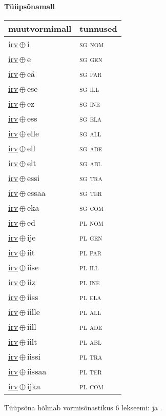 

\vspace{3.5em}
\noindent \begin{minipage}{\textwidth}
\noindent \textbf{Tüüpsõnamall \,}\\

\begin{sideways}
\begin{tabular}{l l}
muutvormimall & tunnused \\
\hline
\underline{irv}\,$\oplus$\,i & \textsc{ sg nom } \\
\underline{irv}\,$\oplus$\,e & \textsc{ sg gen } \\
\underline{irv}\,$\oplus$\,eä & \textsc{ sg par } \\
\underline{irv}\,$\oplus$\,ese & \textsc{ sg ill } \\
\underline{irv}\,$\oplus$\,ez & \textsc{ sg ine } \\
\underline{irv}\,$\oplus$\,ess & \textsc{ sg ela } \\
\underline{irv}\,$\oplus$\,elle & \textsc{ sg all } \\
\underline{irv}\,$\oplus$\,ell & \textsc{ sg ade } \\
\underline{irv}\,$\oplus$\,elt & \textsc{ sg abl } \\
\underline{irv}\,$\oplus$\,essi & \textsc{ sg tra } \\
\underline{irv}\,$\oplus$\,essaa & \textsc{ sg ter } \\
\underline{irv}\,$\oplus$\,eka & \textsc{ sg com } \\
\underline{irv}\,$\oplus$\,ed & \textsc{ pl nom } \\
\underline{irv}\,$\oplus$\,ije & \textsc{ pl gen } \\
\underline{irv}\,$\oplus$\,iit & \textsc{ pl par } \\
\underline{irv}\,$\oplus$\,iise & \textsc{ pl ill } \\
\underline{irv}\,$\oplus$\,iiz & \textsc{ pl ine } \\
\underline{irv}\,$\oplus$\,iiss & \textsc{ pl ela } \\
\underline{irv}\,$\oplus$\,iille & \textsc{ pl all } \\
\underline{irv}\,$\oplus$\,iill & \textsc{ pl ade } \\
\underline{irv}\,$\oplus$\,iilt & \textsc{ pl abl } \\
\underline{irv}\,$\oplus$\,iissi & \textsc{ pl tra } \\
\underline{irv}\,$\oplus$\,iissaa & \textsc{ pl ter } \\
\underline{irv}\,$\oplus$\,ijka & \textsc{ pl com } \\
\end{tabular}
\end{sideways}
\label{tab:tüüpsõnamall-irvi}

\end{minipage}

 
\vspace{1em}
\noindent Tüüpsõna hõlmab vormisõnastikus 6 lekseemi:  ja .
